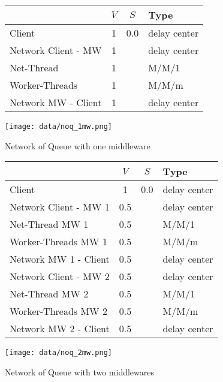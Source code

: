 \documentclass[report.tex]{subfiles}
\begin{document}
\begin{figure}
	\begin{minipage}[c]{0.45\linewidth}
		\centering
		\scriptsize{
			\begin{tabular}{|l|c|c|l|}
				\hline 
				& $V$ & $S$ & Type \Tstrut\\ 
				\hline 
				Client & 1 & 0.0  & delay center \Tstrut\\ 
				\hline 
				Network Client - MW & 1 &  & delay center \Tstrut\\  
				Net-Thread & 1 &  & M/M/1 \\ 
				Worker-Threads & 1 &  & M/M/m  \\ 
				Network MW - Client & 1 &  & delay center \\ 
				\hline 
			\end{tabular} 
		} 
	\end{minipage}
	\hspace{0.5cm}
	\begin{minipage}[c]{0.45\linewidth}
	\centering
	\texttt{[image: data/noq\_1mw.png]}
\end{minipage}
	\caption{Network of Queue with one middleware}
	\label{exp70_noq_1mw}
\end{figure}



\begin{figure}
	\begin{minipage}[c]{0.45\linewidth}
		\centering
		\scriptsize{
			\begin{tabular}{|l|c|c|l|}
				\hline 
				& $V$ & $S$ & Type \Tstrut\\ 
				\hline 
				Client & 1 & 0.0  & delay center \Tstrut\\ 
				\hline 
				Network Client - MW 1 & 0.5 &  & delay center \Tstrut\\ 
				Net-Thread MW 1 & 0.5 &  & M/M/1 \\ 
				Worker-Threads MW 1 & 0.5 &  & M/M/m  \\ 
				Network MW 1 - Client & 0.5 &  & delay center \\ 
				\hline 
				Network Client - MW 2 & 0.5 &  & delay center \Tstrut\\  
				Net-Thread MW 2 & 0.5 &  & M/M/1 \\ 
				Worker-Threads MW 2 & 0.5 &  & M/M/m  \\
				Network MW 2 - Client & 0.5 &  & delay center \\ 
				\hline 
			\end{tabular} 
		} 
	\end{minipage}
	\hspace{0.5cm}
	\begin{minipage}[c]{0.45\linewidth}
		\centering
		\texttt{[image: data/noq\_2mw.png]}
	\end{minipage}
	\caption{Network of Queue with two middlewares}
	\label{exp70_noq_2mw}
\end{figure}

\end{document}
